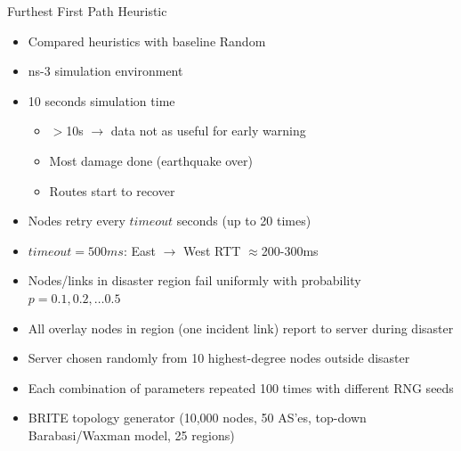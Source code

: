 \documentclass[pdftex]{beamer}
\begin{document}


\begin{frame}{Furthest First Path Heuristic}
\begin{itemize}
	\item Compared heuristics with baseline Random
	\item ns-3 simulation environment
	\item 10 seconds simulation time
	\begin{itemize}
		\item $>$10s $\rightarrow$ data not as useful for early warning
		\item Most damage done (earthquake over)
		\item Routes start to recover
	\end{itemize}
	\item Nodes retry every $timeout$ seconds (up to 20 times)
	\item $timeout = 500ms$: East $\rightarrow$ West RTT $\approx$200-300ms
	\item Nodes/links in disaster region fail uniformly with probability $p = 0.1, 0.2, … 0.5$
	\item All overlay nodes in region (one incident link) report to server during disaster
	\item Server chosen randomly from 10 highest-degree nodes outside disaster
	\item Each combination of parameters repeated 100 times with different RNG seeds
	\item BRITE topology generator (10,000 nodes, 50 AS'es, top-down Barabasi/Waxman model, 25 regions)
\end{itemize}
\end{frame}
\end{document}
